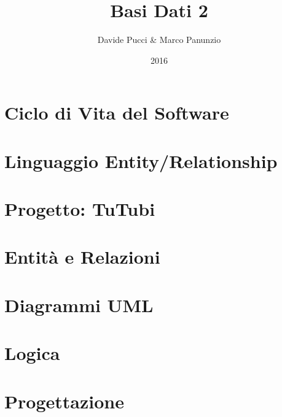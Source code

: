 

\title{Basi Dati 2}
\author{Davide Pucci \& Marco Panunzio}
\date{2016}

\maketitle

\tableofcontents

\chapter{Ciclo di Vita del Software}


\chapter{Linguaggio Entity/Relationship}


\chapter{Progetto: TuTubi}


\chapter{Entità e Relazioni}


\chapter{Diagrammi UML}


\chapter{Logica}


\chapter{Progettazione}



